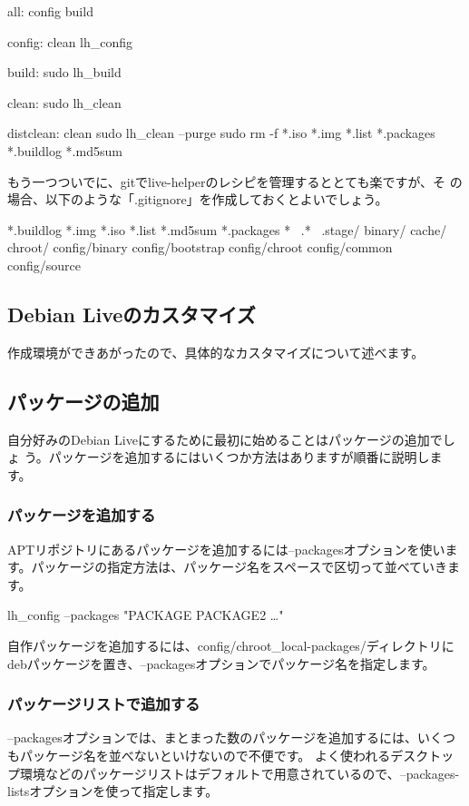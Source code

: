 \documentclass[mingoth,a4paper]{jsarticle}
\begin{document}
\begin{commandline}
 all: config build

 config: clean
        lh_config

 build:
        sudo lh_build

 clean:
        sudo lh_clean

 distclean: clean
        sudo lh_clean --purge
        sudo rm -f *.iso *.img *.list *.packages *.buildlog *.md5sum
\end{commandline}

もう一つついでに、gitでlive-helperのレシピを管理するととても楽ですが、そ
の場合、以下のような「.gitignore」を作成しておくとよいでしょう。

\begin{commandline}
 *.buildlog
 *.img
 *.iso
 *.list
 *.md5sum
 *.packages
 *~
 .*~
 .stage/
 binary/
 cache/
 chroot/
 config/binary
 config/bootstrap
 config/chroot
 config/common
 config/source
\end{commandline}

\newpage

\subsection{Debian Liveのカスタマイズ}
作成環境ができあがったので、具体的なカスタマイズについて述べます。

\subsection{パッケージの追加}
自分好みのDebian Liveにするために最初に始めることはパッケージの追加でしょ
う。パッケージを追加するにはいくつか方法はありますが順番に説明します。

\subsubsection{パッケージを追加する}
APTリポジトリにあるパッケージを追加するには--packagesオプションを使います。パッケージの指定方法は、パッケージ名をスペースで区切って並べていきます。

\begin{commandline}
 lh_config --packages "PACKAGE PACKAGE2 …"
\end{commandline}

自作パッケージを追加するには、config/chroot\_local-packages/ディレクトリにdebパッケージを置き、--packagesオプションでパッケージ名を指定します。

\subsubsection{パッケージリストで追加する}
--packagesオプションでは、まとまった数のパッケージを追加するには、いくつもパッケージ名を並べないといけないので不便です。
よく使われるデスクトップ環境などのパッケージリストはデフォルトで用意されているので、--packages-listsオプションを使って指定します。
\end{document}
